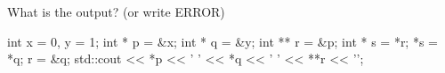 \nextq
What is the output? (or write ERROR)
\begin{console}[fontsize=\small]
int x = 0, y = 1;
int * p = &x;
int * q = &y;
int ** r = &p;
int * s = *r;
*s = *q;
r = &q;
std::cout << *p << ' ' << *q << ' ' << **r << '\n';
\end{console}
\\ \ANSWER
\begin{answercode}

\end{answercode}

